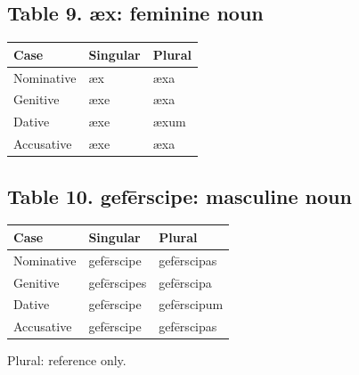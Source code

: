 \subsection*{Table 9. æx: feminine noun}

\par\begingroup
\fontsize{10.5}{13.2}\selectfont
\setlength{\LTleft}{0pt}\setlength{\LTright}{\fill}
\noindent
\begin{tabular}{@{}>{\raggedright\arraybackslash}p{39.46mm}>{\raggedright\arraybackslash}p{39.46mm}>{\raggedright\arraybackslash}p{39.46mm}@{}}
\toprule
\textbf{Case} & \textbf{Singular} & \textbf{Plural} \\
\midrule
Nominative & æx & æxa \\
Genitive & æxe & æxa \\
Dative & æxe & æxum \\
Accusative & æxe & æxa \\
\bottomrule
\end{tabular}
\par\endgroup

\subsection*{Table 10. gefērscipe: masculine noun}

\par\begingroup
\fontsize{10.5}{13.2}\selectfont
\setlength{\LTleft}{0pt}\setlength{\LTright}{\fill}
\noindent
\begin{tabular}{@{}>{\raggedright\arraybackslash}p{36.99mm}>{\raggedright\arraybackslash}p{40.69mm}>{\raggedright\arraybackslash}p{40.69mm}@{}}
\toprule
\textbf{Case} & \textbf{Singular} & \textbf{Plural} \\
\midrule
Nominative & gefērscipe & gefērscipas \\
Genitive & gefērscipes & gefērscipa \\
Dative & gefērscipe & gefērscipum \\
Accusative & gefērscipe & gefērscipas \\
\bottomrule
\end{tabular}
\par\endgroup

Plural: reference only.


